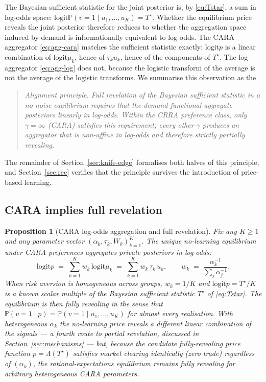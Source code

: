 \documentclass[12pt,letterpaper]{article}
\newtheorem{proposition}{Proposition}
\theoremstyle{definition}
\theoremstyle{remark}
\newcommand{\PP}{\mathbb{P}}
\newcommand{\Lam}{\Lambda}            %
\newcommand{\logit}{\mathrm{logit}}
\newcommand{\Tstar}{T^{\!\star}}
\newcommand{\1}{\mathbf{1}}
\begin{document}
The Bayesian sufficient statistic for the joint posterior is, by
\eqref{eq:Tstar}, a sum in log-odds space:
$\logit\PP(v=1\mid u_{1},\ldots,u_{K})=\Tstar$. Whether the equilibrium
price reveals the joint posterior therefore reduces to whether the
aggregation space induced by demand is informationally equivalent to
log-odds. The CARA aggregator \eqref{eq:agg-cara} matches the sufficient
statistic exactly: $\logit p$ is a linear combination of $\logit\mu_{k}$,
hence of $\tau_{k}u_{k}$, hence of the components of $\Tstar$. The log
aggregator \eqref{eq:agg-log} does not, because the logistic transform of
the average is not the average of the logistic transforms. We summarise
this observation as the
\begin{quote}
\itshape Alignment principle. Full revelation of the Bayesian sufficient
statistic in a no-noise equilibrium requires that the demand functional
aggregate posteriors linearly in log-odds. Within the CRRA preference
class, only $\gamma=\infty$ (CARA) satisfies this requirement; every
other $\gamma$ produces an aggregator that is non-affine in log-odds and
therefore strictly partially revealing.
\end{quote}
The remainder of Section~\ref{sec:knife-edge} formalises both halves of
this principle, and Section~\ref{sec:ree} verifies that the principle
survives the introduction of price-based learning.

\subsection{CARA implies full revelation}

\begin{proposition}[CARA log-odds aggregation and full revelation]\label{prop:cara}
Fix any $K\geq 1$ and any parameter vector
$(\alpha_{k},\tau_{k},W_{k})_{k=1}^{K}$. The unique no-learning equilibrium
under CARA preferences aggregates private posteriors in log-odds:
\begin{equation}
   \logit p \;=\; \sum_{k=1}^{K} w_{k}\,\logit\mu_{k}
              \;=\; \sum_{k=1}^{K} w_{k}\,\tau_{k}\,u_{k},
   \qquad w_{k} \;=\; \frac{\alpha^{-1}_{k}}{\sum_{j}\alpha^{-1}_{j}}.
\label{eq:cara-clearing}
\end{equation}
When risk aversion is homogeneous across groups, $w_{k}=1/K$ and
$\logit p=\Tstar/K$ is a known scalar multiple of the Bayesian sufficient
statistic $\Tstar$ of \eqref{eq:Tstar}. The equilibrium is then fully
revealing in the sense that
$\PP(v=1\mid p)=\PP(v=1\mid u_{1},\ldots,u_{K})$ for almost every realisation.
With heterogeneous $\alpha_{k}$ the no-learning price reveals a different
linear combination of the signals --- a fourth route to partial revelation,
discussed in Section~\ref{sec:mechanisms} --- but, because the candidate
fully-revealing price function $p=\Lam(\Tstar)$ satisfies market clearing
identically (zero trade) regardless of $(\alpha_{k})$, the
\emph{rational-expectations} equilibrium remains fully revealing for
arbitrary heterogeneous CARA parameters.
\end{proposition}
\end{document}
